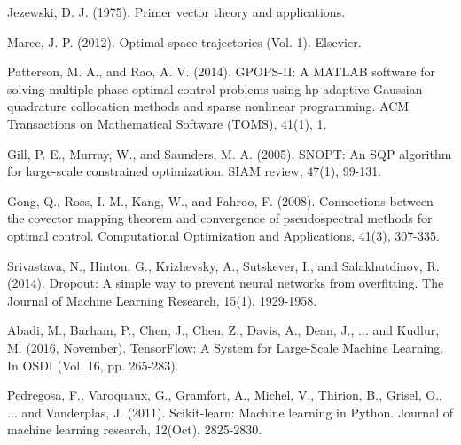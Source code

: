 \documentclass[10pt,a4paper]{article}
\begin{document}
	\newpage
	\begin{thebibliography}{1}
	Jezewski, D. J. (1975). Primer vector theory and applications.
	
	Marec, J. P. (2012). Optimal space trajectories (Vol. 1). Elsevier.
	
 	Patterson, M. A., and Rao, A. V. (2014). GPOPS-II: A MATLAB software for solving multiple-phase optimal control problems using hp-adaptive Gaussian quadrature collocation methods and sparse nonlinear programming. ACM Transactions on Mathematical Software (TOMS), 41(1), 1.
 	
 	Gill, P. E., Murray, W., and Saunders, M. A. (2005). SNOPT: An SQP algorithm for large-scale constrained optimization. SIAM review, 47(1), 99-131.
 	
 	Gong, Q., Ross, I. M., Kang, W., and Fahroo, F. (2008). Connections between the covector mapping theorem and convergence of pseudospectral methods for optimal control. Computational Optimization and Applications, 41(3), 307-335.
 	
 	Srivastava, N., Hinton, G., Krizhevsky, A., Sutskever, I., and Salakhutdinov, R. (2014). Dropout: A simple way to prevent neural networks from overfitting. The Journal of Machine Learning Research, 15(1), 1929-1958.
 	
 	Abadi, M., Barham, P., Chen, J., Chen, Z., Davis, A., Dean, J., ... and Kudlur, M. (2016, November). TensorFlow: A System for Large-Scale Machine Learning. In OSDI (Vol. 16, pp. 265-283).
 	
	 Pedregosa, F., Varoquaux, G., Gramfort, A., Michel, V., Thirion, B., Grisel, O., ... and Vanderplas, J. (2011). Scikit-learn: Machine learning in Python. Journal of machine learning research, 12(Oct), 2825-2830.
	\end{thebibliography}
\end{document}
